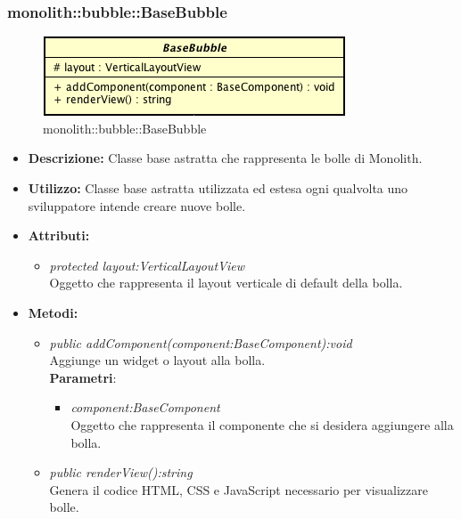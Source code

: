 \subsubsection{monolith::bubble::BaseBubble}

\label{monolith::bubble::BaseBubble}
\begin{figure}[H]
	\centering
	\includegraphics[scale=0.5]{Sezioni/SottosezioniST/img/BaseBubble.png}
	\caption{monolith::bubble::BaseBubble}
\end{figure}

\begin{itemize}
\item \textbf{Descrizione:} Classe base astratta che rappresenta le bolle di Monolith.
\item \textbf{Utilizzo:} Classe base astratta utilizzata ed estesa ogni qualvolta uno sviluppatore intende creare nuove bolle.
\item \textbf{Attributi:} 
\begin{itemize}
\item \textit{protected layout:VerticalLayoutView}\\
Oggetto che rappresenta il layout verticale di default della bolla.
\end{itemize}
\item \textbf{Metodi:}
\begin{itemize}
	\item \textit{public addComponent(component:BaseComponent):void}\\
Aggiunge un widget o layout alla bolla.
		  \\ \textbf{Parametri}: \begin{itemize}
				\item \textit{component:BaseComponent}\\
					Oggetto che rappresenta il componente che si desidera aggiungere alla bolla.
			\end{itemize}
	\item \textit{public renderView():string}\\
Genera il codice HTML, CSS e JavaScript necessario per visualizzare bolle.
\end{itemize}
\end{itemize}

